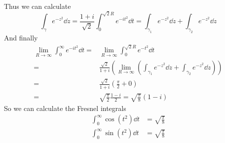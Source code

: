 \documentclass[../../script.tex]{subfiles}
\begin{document}
\begin{eg}
\[    \]
    Thus we can calculate 
    \[
        \int_{\gamma} e^{-z^2} \dd{z} = \frac{1+i}{\sqrt{2}} \int_0^{\sqrt{2} R} e^{-it^2} \dd{t} = \int_{\gamma_1} e^{-z^2} \dd{z} + \int_{\gamma_2} e^{-z^2} \dd{z}
    \]
    And finally 
    \begin{align*}
        \lim_{R \rightarrow \infty} \int_0^{\infty} e^{-it^2} \dd{t} = &\lim_{R \rightarrow \infty} \int_0^{\sqrt{2} R} e^{-t^2} \dd{t} \\
        = &\frac{\sqrt{2}}{1+i} \left(\lim_{R \rightarrow \infty} \left( \int_{\gamma_1} e^{-z^2} \dd{z} + \int_{\gamma_2} e^{-z^2} \dd{z} \right) \right) \\
        = &\frac{\sqrt{2}}{1+i} \left(\frac{\pi}{2} + 0\right) \\
        = &\sqrt{\frac{\pi}{2}} \frac{1-i}{2} = \sqrt{\frac{\pi}{8}} (1 - i)
    \end{align*}
    So we can calculate the Fresnel integrals
    \begin{align*}
        \int_0^{\infty} \cos(t^2) \dd{t} &= \sqrt{\frac{\pi}{8}} \\ 
        \int_0^{\infty} \sin(t^2) \dd{t} &= \sqrt{\frac{\pi}{8}} 
    \end{align*}
\end{eg}
\end{document}
